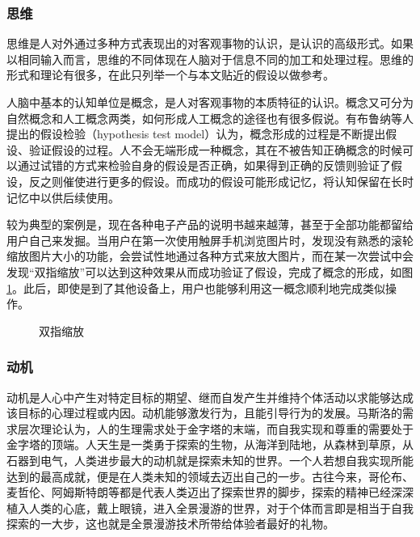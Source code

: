 \subsubsection{思维}
思维是人对外通过多种方式表现出的对客观事物的认识，是认识的高级形式。如果以相同输入而言，思维的不同体现在人脑对于信息不同的加工和处理过程。思维的形式和理论有很多，在此只列举一个与本文贴近的假设以做参考。

人脑中基本的认知单位是概念，是人对客观事物的本质特征的认识。概念又可分为自然概念和人工概念两类，如何形成人工概念的途径也有很多假说。有布鲁纳等人提出的假设检验（hypothesis test model）认为，概念形成的过程是不断提出假设、验证假设的过程。人不会无端形成一种概念，其在不被告知正确概念的时候可以通过试错的方式来检验自身的假设是否正确，如果得到正确的反馈则验证了假设，反之则催使进行更多的假设。而成功的假设可能形成记忆，将认知保留在长时记忆中以供后续使用。

较为典型的案例是，现在各种电子产品的说明书越来越薄，甚至于全部功能都留给用户自己来发掘。当用户在第一次使用触屏手机浏览图片时，发现没有熟悉的滚轮缩放图片大小的功能，会尝试性地通过各种方式来放大图片，而在某一次尝试中会发现“双指缩放”可以达到这种效果从而成功验证了假设，完成了概念的形成，如图\ref{fig:stretch}。此后，即使是到了其他设备上，用户也能够利用这一概念顺利地完成类似操作。

\begin{figure}[htp]
\centering
{}
\caption{双指缩放}
\label{fig:stretch}
\end{figure}

\subsubsection{动机}
动机是人心中产生对特定目标的期望、继而自发产生并维持个体活动以求能够达成该目标的心理过程或内因。动机能够激发行为，且能引导行为的发展。马斯洛的需求层次理论认为，人的生理需求处于金字塔的末端，而自我实现和尊重的需要处于金字塔的顶端。人天生是一类勇于探索的生物，从海洋到陆地，从森林到草原，从石器到电气，人类进步最大的动机就是探索未知的世界。一个人若想自我实现所能达到的最高成就，便是在人类未知的领域去迈出自己的一步。古往今来，哥伦布、麦哲伦、阿姆斯特朗等都是代表人类迈出了探索世界的脚步，探索的精神已经深深植入人类的心底，戴上眼镜，进入全景漫游的世界，对于个体而言即是相当于自我探索的一大步，这也就是全景漫游技术所带给体验者最好的礼物。
